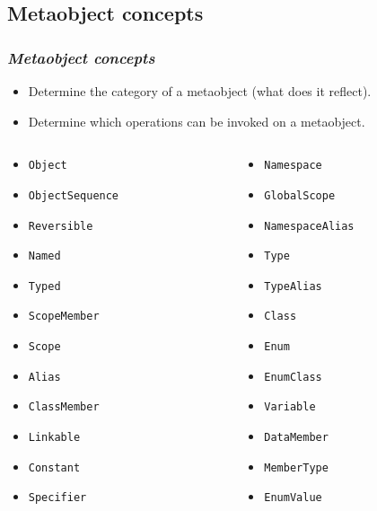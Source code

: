 \documentclass[compress,table,xcolor=table]{beamer}
\begin{document}
\subsection{Metaobject concepts}
\begin{frame}
\frametitle{{\em Metaobject concepts}}
  \begin{itemize}
    \small
    \item Determine the category of a metaobject (what does it reflect).
    \item Determine which operations can be invoked on a metaobject.
  \end{itemize}
  \begin{columns}
    \scriptsize
    \begin{column}{0.35\textwidth}
      \begin{itemize}
      \item \texttt{Object}
      \item \texttt{ObjectSequence}
      \item \texttt{Reversible}
      \item \texttt{Named}
      \item \texttt{Typed}
      \item \texttt{ScopeMember}
      \item \texttt{Scope}
      \item \texttt{Alias}
      \item \texttt{ClassMember}
      \item \texttt{Linkable}
      \item \texttt{Constant}
      \item \texttt{Specifier}
      \end{itemize}
    \end{column}
    \begin{column}{0.35\textwidth}
      \begin{itemize}
      \item \texttt{Namespace}
      \item \texttt{GlobalScope}
      \item \texttt{NamespaceAlias}
      \item \texttt{Type}
      \item \texttt{TypeAlias}
      \item \texttt{Class}
      \item \texttt{Enum}
      \item \texttt{EnumClass}
      \item \texttt{Variable}
      \item \texttt{DataMember}
      \item \texttt{MemberType}
      \item \texttt{EnumValue}
      \end{itemize}
    \end{column}
  \end{columns}
\end{frame}
\end{document}
